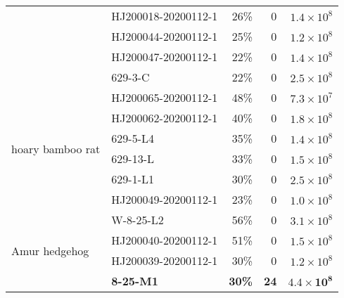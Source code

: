 \documentclass[9pt,twocolumn,twoside]{gsajnl_modified}
\begin{document}
\begin{table}
\begin{tabular}{llrrr}
                 & HJ200018-20200112-1 &                                26\% &                        0 &                   $1.4 \times 10^8$ \\
                 & HJ200044-20200112-1 &                                25\% &                        0 &                   $1.2 \times 10^8$ \\
                 & HJ200047-20200112-1 &                                22\% &                        0 &                   $1.4 \times 10^8$ \\
                 & 629-3-C &                                22\% &                        0 &                   $2.5 \times 10^8$ \\
\cline{1-5}
\multirow{6}{*}{hoary bamboo rat} & HJ200065-20200112-1 &                                48\% &                        0 &                   $7.3 \times 10^7$ \\
                 & HJ200062-20200112-1 &                                40\% &                        0 &                   $1.8 \times 10^8$ \\
                 & 629-5-L4 &                                35\% &                        0 &                   $1.4 \times 10^8$ \\
                 & 629-13-L &                                33\% &                        0 &                   $1.5 \times 10^8$ \\
                 & 629-1-L1 &                                30\% &                        0 &                   $2.5 \times 10^8$ \\
                 & HJ200049-20200112-1 &                                23\% &                        0 &                     $1.0 \times 10^8$ \\
\cline{1-5}
\multirow{6}{*}{Amur hedgehog} & W-8-25-L2 &                                56\% &                        0 &                   $3.1 \times 10^8$ \\
                 & HJ200040-20200112-1 &                                51\% &                        0 &                   $1.5 \times 10^8$ \\
                 & HJ200039-20200112-1 &                                30\% &                        0 &                   $1.2 \times 10^8$ \\
                 & {\bf 8-25-M1} &                                {\bf 30\%} &                      {\bf 24} &                   $\mathbf{4.4 \times 10^8}$ \\

\end{tabular}
\end{table}
\end{document}
